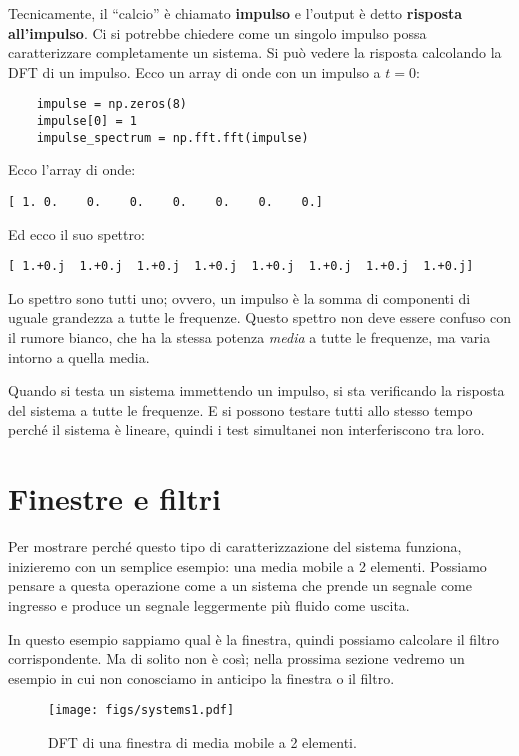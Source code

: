 \documentclass[12pt]{book} \usepackage[width=5.5in,height=8.5in, hmarginratio=3:2,vmarginratio=1:1]{geometry}
\begin{document}
Tecnicamente, il ``calcio'' è chiamato {\bf impulso} e l'output è detto {\bf risposta all'impulso}. Ci si potrebbe chiedere come un singolo impulso possa caratterizzare completamente un sistema. Si può vedere la risposta calcolando la DFT di un impulso. Ecco un array di onde con un impulso a $t=0$:

\begin{verbatim} 
    impulse = np.zeros(8)
    impulse[0] = 1
    impulse_spectrum = np.fft.fft(impulse)
 \end{verbatim} 

Ecco l'array di onde:

\begin{verbatim} 
[ 1. 0.    0.    0.    0.    0.    0.    0.]
 \end{verbatim} 

Ed ecco il suo spettro:

\begin{verbatim} 
[ 1.+0.j  1.+0.j  1.+0.j  1.+0.j  1.+0.j  1.+0.j  1.+0.j  1.+0.j]
 \end{verbatim} 

Lo spettro sono tutti uno; ovvero, un impulso è la somma di componenti di uguale grandezza a tutte le frequenze. Questo spettro non deve essere confuso con il rumore bianco, che ha la stessa potenza {\em media} a tutte le frequenze, ma varia intorno a quella media.

Quando si testa un sistema immettendo un impulso, si sta verificando la risposta del sistema a tutte le frequenze. E si possono testare tutti allo stesso tempo perché il sistema è lineare, quindi i test simultanei non interferiscono tra loro.

\section{Finestre e filtri} \label{winfilt} 

Per mostrare perché questo tipo di caratterizzazione del sistema funziona, inizieremo con un semplice esempio: una media mobile a 2 elementi. Possiamo pensare a questa operazione come a un sistema che prende un segnale come ingresso e produce un segnale leggermente più fluido come uscita.

In questo esempio sappiamo qual è la finestra, quindi possiamo calcolare il filtro corrispondente. Ma di solito non è così; nella prossima sezione vedremo un esempio in cui non conosciamo in anticipo la finestra o il filtro.

\begin{figure} 

\centerline{\texttt{[image: figs/systems1.pdf]}} \caption{DFT di una finestra di media mobile a 2 elementi.} \label{fig.systems1} \end{figure} 
\end{document}
